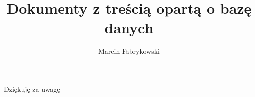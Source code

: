 \documentclass[12pt]{beamer}
\author{Marcin Fabrykowski}
\title{Dokumenty z treścią opartą o bazę danych}
\begin{document}
\begin{frame}
	\titlepage
\end{frame}
\begin{frame}
		Dziękuję za uwagę
\end{frame}
\end{document}
